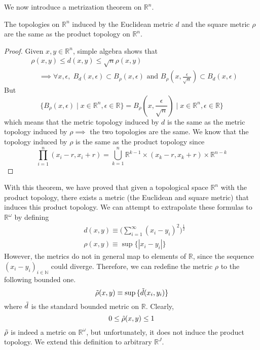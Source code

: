   We now introduce a metrization theorem on $\mathbb{R}^n$. 

  \begin{theorem}
    The topologies on $\mathbb{R}^n$ induced by the Euclidean metric $d$ and the square metric $\rho$ are the same as the product topology on $\mathbb{R}^n$. 
  \end{theorem}
  \begin{proof}
    Given $x, y \in \mathbb{R}^n$, simple algebra shows that 
    \begin{align*}
      & \rho(x, y) \leq d(x, y) \leq \sqrt{n} \rho(x, y) \\
      & \;\;\;\; \implies \forall x, \epsilon, \; B_d (x, \epsilon) \subset B_\rho (x, \epsilon) \text{ and } B_\rho (x, \frac{\epsilon}{\sqrt{n}}) \subset B_d (x, \epsilon)
    \end{align*}
    But
    \begin{equation}
      \{ B_\rho (x, \epsilon) \mid x \in \mathbb{R}^n, \epsilon \in \mathbb{R}\} = B_\rho (x, \frac{\epsilon}{\sqrt{n}}) \mid x \in \mathbb{R}^n, \epsilon \in \mathbb{R}\}
    \end{equation}
    which means that the metric topology induced by $d$ is the same as the metric topology induced by $\rho \implies$ the two topologies are the same. We know that the topology induced by $\rho$ is the same as the product topology since 
    \begin{equation}
      \prod_{i=1}^n (x_i - r, x_i + r) = \bigcup_{k=1}^n \mathbb{R}^{k-1} \times (x_k - r, x_k + r) \times \mathbb{R}^{n-k}
    \end{equation}
  \end{proof}

  With this theorem, we have proved that given a topological space $\mathbb{R}^n$ with the product topology, there exists a metric (the Euclidean and square metric) that induces this product topology. We can attempt to extrapolate these formulas to $\mathbb{R}^\omega$ by defining
  \begin{align*}
    & d(x, y) \equiv \bigg(\sum_{i=1}^\infty (x_i - y_i)^2 \bigg)^{\frac{1}{2}} \\
    & \rho(x, y) \equiv \sup{\{|x_i - y_i|\}}
  \end{align*}
  However, the metrics do not in general map to elements of $\mathbb{R}$, since the sequence $(x_i - y_i)_{i \in \mathbb{N}}$ could diverge. Therefore, we can redefine the metric $\rho$ to the following bounded one. 
  \begin{equation}
    \Tilde{\rho} (x, y) \equiv \sup{\{\Tilde{d}(x_i, y_i)\}}
  \end{equation}
  where $\Tilde{d}$ is the standard bounded metric on $\mathbb{R}$. Clearly,
  \begin{equation}
    0 \leq \Tilde{\rho}(x, y) \leq 1
  \end{equation}
  $\Tilde{\rho}$ is indeed a metric on $\mathbb{R}^\omega$, but unfortunately, it does not induce the product topology. We extend this definition to arbitrary $\mathbb{R}^J$. 
  
